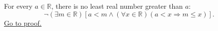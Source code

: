\begin{theorem}\label{thm:no-immediate-successors-in-r}
For every $a\in\mathbb{R}$, there is no least real number greater than $a$:
\[
  \neg(\exists m\in\mathbb{R})
  \left[
  a<m
  \land
  (\forall x\in\mathbb{R})(a<x\Longrightarrow m\leq x)
  \right].
\]
\hyperref[prf:no-immediate-successors-in-r]{Go to proof.}
\end{theorem}